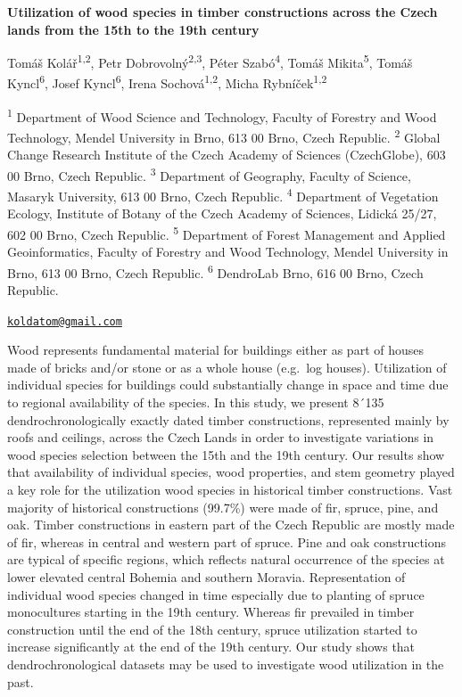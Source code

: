 \documentclass[
]{book}
\begin{document}
\textbf{Utilization of wood species in timber constructions across the Czech lands from the 15th to the 19th century}

Tomáš Kolář\textsuperscript{1,2}, Petr Dobrovolný\textsuperscript{2,3}, Péter Szabó\textsuperscript{4}, Tomáš Mikita\textsuperscript{5}, Tomáš Kyncl\textsuperscript{6}, Josef Kyncl\textsuperscript{6}, Irena Sochová\textsuperscript{1,2}, Micha Rybníček\textsuperscript{1,2}

\textsuperscript{1} Department of Wood Science and Technology, Faculty of Forestry and Wood Technology, Mendel University in Brno, 613 00 Brno, Czech Republic. \textsuperscript{2} Global Change Research Institute of the Czech Academy of Sciences (CzechGlobe), 603 00 Brno, Czech Republic. \textsuperscript{3} Department of Geography, Faculty of Science, Masaryk University, 613 00 Brno, Czech Republic. \textsuperscript{4} Department of Vegetation Ecology, Institute of Botany of the Czech Academy of Sciences, Lidická 25/27, 602 00 Brno, Czech Republic. \textsuperscript{5} Department of Forest Management and Applied Geoinformatics, Faculty of Forestry and Wood Technology, Mendel University in Brno, 613 00 Brno, Czech Republic. \textsuperscript{6} DendroLab Brno, 616 00 Brno, Czech Republic.

\href{mailto:koldatom@gmail.com}{\nolinkurl{koldatom@gmail.com}}

Wood represents fundamental material for buildings either as part of houses made of bricks and/or stone or as a whole house (e.g.~log houses). Utilization of individual species for buildings could substantially change in space and time due to regional availability of the species. In this study, we present 8´135 dendrochronologically exactly dated timber constructions, represented mainly by roofs and ceilings, across the Czech Lands in order to investigate variations in wood species selection between the 15th and the 19th century. Our results show that availability of individual species, wood properties, and stem geometry played a key role for the utilization wood species in historical timber constructions. Vast majority of historical constructions (99.7\%) were made of fir, spruce, pine, and oak. Timber constructions in eastern part of the Czech Republic are mostly made of fir, whereas in central and western part of spruce. Pine and oak constructions are typical of specific regions, which reflects natural occurrence of the species at lower elevated central Bohemia and southern Moravia. Representation of individual wood species changed in time especially due to planting of spruce monocultures starting in the 19th century. Whereas fir prevailed in timber construction until the end of the 18th century, spruce utilization started to increase significantly at the end of the 19th century. Our study shows that dendrochronological datasets may be used to investigate wood utilization in the past.
\end{document}
